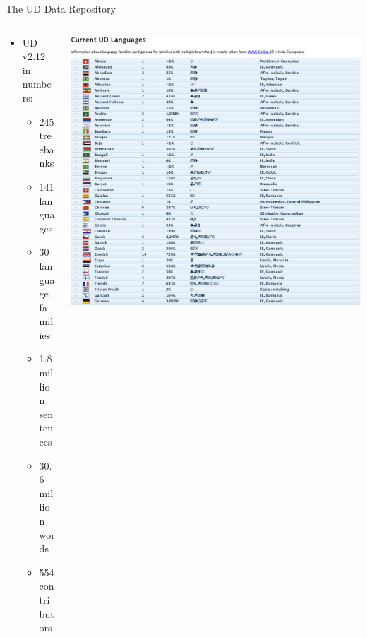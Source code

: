 \documentclass[10pt, compress, aspectratio=169]{beamer}
\begin{document}
\begin{frame}{The UD Data Repository}
\begin{columns}[T] %
\begin{column}{.38\textwidth}

\vspace{20mm}
\begin{itemize}
\item UD v2.12 in numbers:
\begin{itemize}
\item 245 treebanks
\item 141 languages
\item 30 language families
\item 1.8 million sentences
\item 30.6 million words
\item 554 contributors
\end{itemize}
\end{itemize}
\end{column}%
\hfill%
\begin{column}{.58\textwidth}
\vspace{-2mm}
\includegraphics[scale=0.34]{images/UD_Treebank_Listing}
\end{column}%
\end{columns}
\end{frame}
\end{document}
